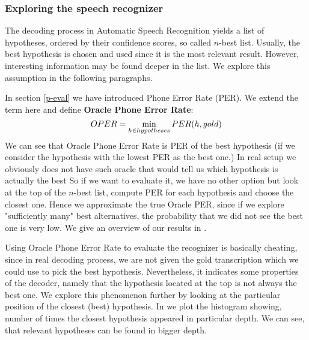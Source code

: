 \subsubsection{Exploring the speech recognizer}
\label{nbest-detail}
The decoding process in Automatic Speech Recognition yields a list of hypotheses, ordered by their confidence scores, so called $n$-best list.
Usually, the best hypothesis is chosen and used since it is the most relevant result.
However, interesting information may be found deeper in the list.
We explore this assumption in the following paragraphs.
\par
In section \ref{p-eval} we have introduced Phone Error Rate (PER).
We extend the term here and define \textbf{Oracle Phone Error Rate}:
\begin{equation}
OPER = \operatorname*{min}_{h \in hypotheses} PER(h, gold)
\end{equation}
We can see that Oracle Phone Error Rate is PER of the best hypothesis (if we consider the hypothesis with the lowest PER as the best one.)
In real setup we obviously does not have such oracle that would tell us which hypothesis is actually the best
So if we want to evaluate it, we have no other option but look at the top of the $n$-best list, compute PER for each hypothesis and choose the closest one.
Hence we approximate the true Oracle PER, since if we explore "sufficiently many" best alternatives, the probability that we did not see the best one is very low.
We give an overview of our results in .
\par
Using Oracle Phone Error Rate to evaluate the recognizer is basically cheating, since in real decoding process, we are not given the gold transcription which we could use to pick the best hypothesis.
Nevertheless, it indicates some properties of the decoder, namely that the hypothesis located at the top is not always the best one.
We explore this phenomenon further by looking at the particular position of the closest (best) hypothesis.
In  we plot the histogram showing, number of times the closest hypothesis appeared in particular depth.
We can see, that relevant hypotheses can be found in bigger depth.
